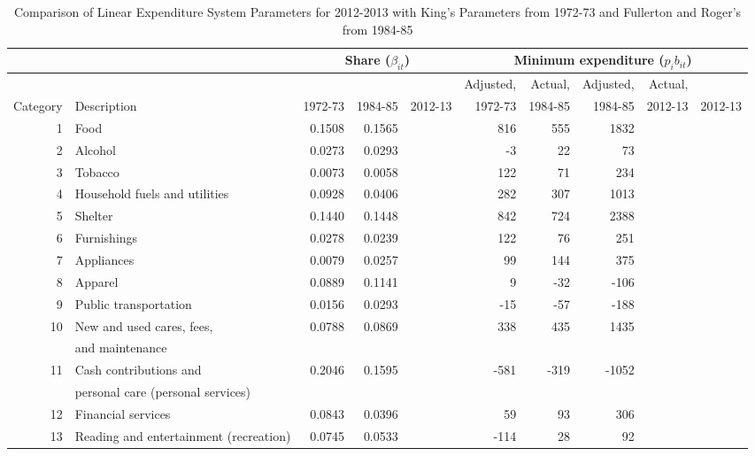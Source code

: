 \documentclass[article,11pt,letterpaper,fleqn]{article}
\theoremstyle{definition}
\numberwithin{equation}{section}
\begin{document}
\begin{table}[h!]
  \centering
  \caption{Comparison of Linear Expenditure System Parameters for 2012-2013 with King's Parameters from 1972-73 and Fullerton and Roger's from 1984-85}
    \begin{tabular}{rlrrrrrrrr}
    \hline
    \hline
          &       & \multicolumn{3}{c}{Share ($\beta_{it}$)} & \multicolumn{5}{c}{Minimum expenditure ($p_{i}b_{it}$)} \\
    \hline
       &  & & & &Adjusted,  & Actual, & Adjusted, & Actual,  \\
    Category & Description & 1972-73 & 1984-85 & 2012-13 & 1972-73 & 1984-85 & 1984-85 &  2012-13 & 2012-13 \\
    1     & Food  & 0.1508 & 0.1565 &       & 816   & 555   & 1832  &       &  \\
    2     & Alcohol & 0.0273 & 0.0293 &       & -3    & 22    & 73    &       &  \\
    3     & Tobacco & 0.0073 & 0.0058 &       & 122   & 71    & 234   &       &  \\
    4     & Household fuels and utilities & 0.0928 & 0.0406 &       & 282   & 307   & 1013  &       &  \\
    5     & Shelter & 0.1440 & 0.1448 &       & 842   & 724   & 2388  &       &  \\
    6     & Furnishings & 0.0278 & 0.0239 &       & 122   & 76    & 251   &       &  \\
    7     & Appliances & 0.0079 & 0.0257 &       & 99    & 144   & 375   &       &  \\
    8     & Apparel & 0.0889 & 0.1141 &       & 9     & -32   & -106  &       &  \\
    9     & Public transportation & 0.0156 & 0.0293 &       & -15   & -57   & -188  &       &  \\
    10    & New and used cares, fees,  & 0.0788 & 0.0869 &       & 338   & 435   & 1435  &       &  \\
     & and maintenance & & & & & & &  \\
    11    & Cash contributions and& 0.2046 & 0.1595 &       & -581  & -319  & -1052 &       &  \\
         &  personal care (personal services)  & & & & & & &  \\
    12    & Financial services & 0.0843 & 0.0396 &       & 59    & 93    & 306   &       &  \\
    13    & Reading and entertainment (recreation) & 0.0745 & 0.0533 &       & -114  & 28    & 92    &       &  \\

\end{tabular}
\end{table}
\end{document}
